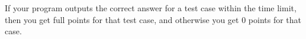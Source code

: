 If your program outputs the correct answer for a test case within the time limit, then you
get full points for that test case, and otherwise you get $0$ points for that case.